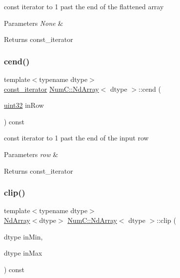 const iterator to 1 past the end of the flattened array


\begin{DoxyParams}{Parameters}
{\em None} & \\
\hline
\end{DoxyParams}
\begin{DoxyReturn}{Returns}
const\+\_\+iterator 
\end{DoxyReturn}
\mbox{\label{class_num_c_1_1_nd_array_ab0ec9dc7cfc8b4aaf2b89a4d05832c73}} 
\subsubsection{\texorpdfstring{cend()}{cend()}\hspace{0.1cm}{\footnotesize\ttfamily [2/2]}}
{\footnotesize\ttfamily template$<$typename dtype$>$ \\
\mbox{\hyperlink{class_num_c_1_1_nd_array_a445cec326684b0066bddae07ba06eddf}{const\+\_\+iterator}} \mbox{\hyperlink{class_num_c_1_1_nd_array}{Num\+C\+::\+Nd\+Array}}$<$ dtype $>$\+::cend (\begin{DoxyParamCaption}\item[{\mbox{\hyperlink{namespace_num_c_ae685802ca6d3035f2b400b081e3953fa}{uint32}}}]{in\+Row }\end{DoxyParamCaption}) const\hspace{0.3cm}{\ttfamily [inline]}}

const iterator to 1 past the end of the input row


\begin{DoxyParams}{Parameters}
{\em row} & \\
\hline
\end{DoxyParams}
\begin{DoxyReturn}{Returns}
const\+\_\+iterator 
\end{DoxyReturn}
\mbox{\label{class_num_c_1_1_nd_array_a0e01615d14c68380987be493adf55258}} 
\subsubsection{\texorpdfstring{clip()}{clip()}}
{\footnotesize\ttfamily template$<$typename dtype$>$ \\
\mbox{\hyperlink{class_num_c_1_1_nd_array}{Nd\+Array}}$<$dtype$>$ \mbox{\hyperlink{class_num_c_1_1_nd_array}{Num\+C\+::\+Nd\+Array}}$<$ dtype $>$\+::clip (\begin{DoxyParamCaption}\item[{dtype}]{in\+Min,  }\item[{dtype}]{in\+Max }\end{DoxyParamCaption}) const\hspace{0.3cm}{\ttfamily [inline]}}

